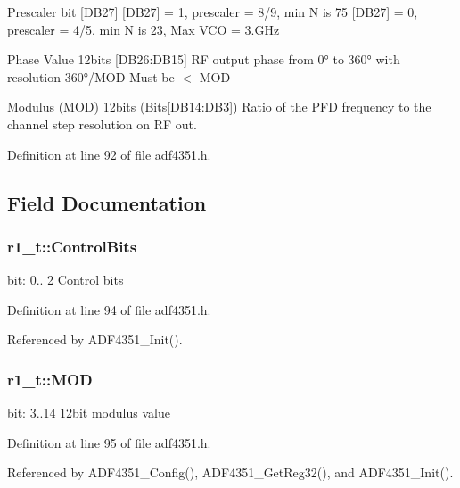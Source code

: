 Prescaler bit \mbox{[}D\+B27\mbox{]} \mbox{[}D\+B27\mbox{]} = 1, prescaler = 8/9, min N is 75 \mbox{[}D\+B27\mbox{]} = 0, prescaler = 4/5, min N is 23, Max V\+CO = 3.\+G\+Hz

Phase Value 12bits \mbox{[}D\+B26\+:D\+B15\mbox{]} RF output phase from 0° to 360° with resolution 360°/\+M\+OD Must be $<$ M\+OD

Modulus (M\+OD) 12bits (Bits\mbox{[}D\+B14\+:D\+B3\mbox{]}) Ratio of the P\+FD frequency to the channel step resolution on RF out. 

Definition at line 92 of file adf4351.\+h.



\subsection{Field Documentation}
\subsubsection[{\texorpdfstring{Control\+Bits}{ControlBits}}]{ r1\+\_\+t\+::\+Control\+Bits}\hypertarget{structr1__t_a5335bbd53d06ad7afb879d919033404c}{}\label{structr1__t_a5335bbd53d06ad7afb879d919033404c}
bit\+: 0.. 2 Control bits 

Definition at line 94 of file adf4351.\+h.



Referenced by A\+D\+F4351\+\_\+\+Init().

\subsubsection[{\texorpdfstring{M\+OD}{MOD}}]{ r1\+\_\+t\+::\+M\+OD}\hypertarget{structr1__t_a9ea14fcf64bbacfbcfa5afa992c0b87d}{}\label{structr1__t_a9ea14fcf64bbacfbcfa5afa992c0b87d}
bit\+: 3..14 12bit modulus value 

Definition at line 95 of file adf4351.\+h.



Referenced by A\+D\+F4351\+\_\+\+Config(), A\+D\+F4351\+\_\+\+Get\+Reg32(), and A\+D\+F4351\+\_\+\+Init().

